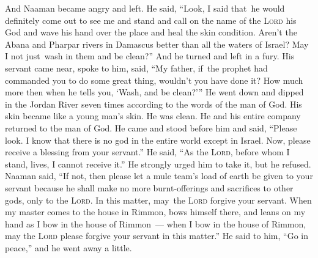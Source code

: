 \begin{inparaenum}
     And Naaman became angry and left. He said, ``Look, I said that\understood\ he would definitely come out to see me and stand and call on the name of the \textsc{Lord} his God and wave his hand over the place and heal the skin condition.%
     Aren't the Abana and Pharpar rivers in Damascus better than all the waters of Israel? May I not just\understood\ wash in them and be clean?'' And he turned and left in a fury.%
     His servant came near, spoke to him, said, ``My father, if\understood\ the prophet had commanded you to do some great thing, wouldn't you have done it? How much more then when he tells you, `Wash, and be clean?'\thinspace''%
     He went down and dipped in the Jordan River seven times according to the words of the man of God. His skin became like a young man's skin. He was clean.%
     He and his entire company returned to the man of God. He came and stood before him and said, ``Please look. I know that there is no god in the entire world except in Israel. Now, please receive a blessing from your servant.''%
     He said, ``As the \textsc{Lord}, before whom I stand, lives, I cannot receive it.'' He strongly urged him to take it, but he refused.%
     Naaman said, ``If not, then please let a mule team's load of earth be given to your servant because he shall make no more burnt-offerings and sacrifices to other gods, only to the \textsc{Lord}.%
     In this matter, may\understood\ the \textsc{Lord} forgive your servant. When my master comes to the house in Rimmon, bows himself there, and leans on my hand as I bow in the house of Rimmon~--- when I bow in the house of Rimmon, may the \textsc{Lord} please forgive your servant in this matter.''%
     He said to him, ``Go in peace,'' and he went away a little.%
    

\end{inparaenum}
